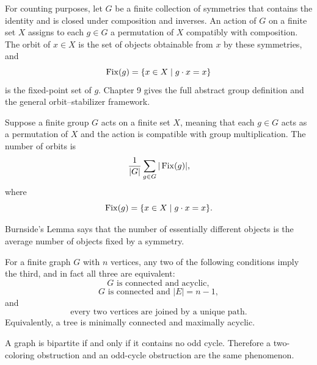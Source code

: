     \begin{definition}
        For counting purposes, let $G$ be a finite collection of symmetries that
        contains the identity and is closed under composition and inverses. An
        action of $G$ on a finite set $X$ assigns to each $g\in G$ a permutation
        of $X$ compatibly with composition. The orbit of $x\in X$ is the set of
        objects obtainable from $x$ by these symmetries, and
        \[
            \operatorname{Fix}(g)=\{x\in X\mid g\cdot x=x\}
        \]
        is the fixed-point set of $g$. Chapter 9 gives the full abstract group
        definition and the general orbit--stabilizer framework.
    \end{definition}

    \begin{theorem}
        Suppose a finite group $G$ acts on a finite set $X$, meaning that each
        $g\in G$ acts as a permutation of $X$ and the action is compatible with
        group multiplication. The number of orbits is
        \[
            \frac{1}{|G|}
            \sum_{g\in G}|\operatorname{Fix}(g)|,
        \]
        where
        \[
            \operatorname{Fix}(g)
            =
            \{x\in X\mid g\cdot x=x\}.
        \]
    \end{theorem}

    \begin{idea}
        Burnside's Lemma says that the number of essentially different objects
        is the average number of objects fixed by a symmetry.
    \end{idea}

    \begin{theorem}
        For a finite graph $G$ with $n$ vertices, any two of the following
        conditions imply the third, and in fact all three are equivalent:
        \[
            G\text{ is connected and acyclic},
        \]
        \[
            G\text{ is connected and }|E|=n-1,
        \]
        and
        \[
            \text{every two vertices are joined by a unique path}.
        \]
        Equivalently, a tree is minimally connected and maximally acyclic.
    \end{theorem}

    \begin{theorem}
        A graph is bipartite if and only if it contains no odd cycle. Therefore
        a two-coloring obstruction and an odd-cycle obstruction are the same
        phenomenon.
    \end{theorem}

